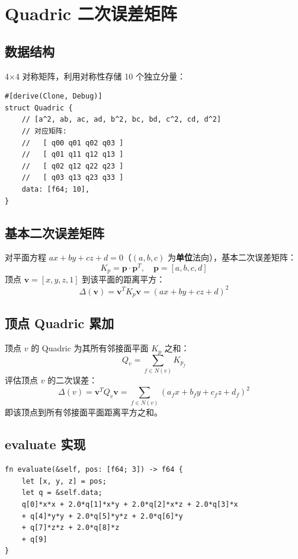 \documentclass[11pt,a4paper]{article}
\begin{document}
\section{Quadric 二次误差矩阵}

\subsection{数据结构}

4×4 对称矩阵，利用对称性存储 10 个独立分量：

\begin{lstlisting}
#[derive(Clone, Debug)]
struct Quadric {
    // [a^2, ab, ac, ad, b^2, bc, bd, c^2, cd, d^2]
    // 对应矩阵:
    //   [ q00 q01 q02 q03 ]
    //   [ q01 q11 q12 q13 ]
    //   [ q02 q12 q22 q23 ]
    //   [ q03 q13 q23 q33 ]
    data: [f64; 10],
}
\end{lstlisting}

\subsection{基本二次误差矩阵}

对平面方程 $ax + by + cz + d = 0$（$(a,b,c)$ 为\textbf{单位}法向），基本二次误差矩阵：
\[
  K_p = \mathbf{p} \cdot \mathbf{p}^T, \quad \mathbf{p} = [a, b, c, d]
\]
顶点 $\mathbf{v} = [x, y, z, 1]$ 到该平面的距离平方：
\[
  \Delta(\mathbf{v}) = \mathbf{v}^T K_p \mathbf{v} = (ax + by + cz + d)^2
\]

\subsection{顶点 Quadric 累加}

顶点 $v$ 的 Quadric 为其所有邻接面平面 $K_p$ 之和：
\[
  Q_v = \sum_{f \in N(v)} K_{p_f}
\]
评估顶点 $v$ 的二次误差：
\[
  \Delta(v) = \mathbf{v}^T Q_v \mathbf{v}
  = \sum_{f \in N(v)} (a_f x + b_f y + c_f z + d_f)^2
\]
即该顶点到所有邻接面平面距离平方之和。

\subsection{evaluate 实现}

\begin{lstlisting}
fn evaluate(&self, pos: [f64; 3]) -> f64 {
    let [x, y, z] = pos;
    let q = &self.data;
    q[0]*x*x + 2.0*q[1]*x*y + 2.0*q[2]*x*z + 2.0*q[3]*x
    + q[4]*y*y + 2.0*q[5]*y*z + 2.0*q[6]*y
    + q[7]*z*z + 2.0*q[8]*z
    + q[9]
}
\end{lstlisting}
\end{document}
